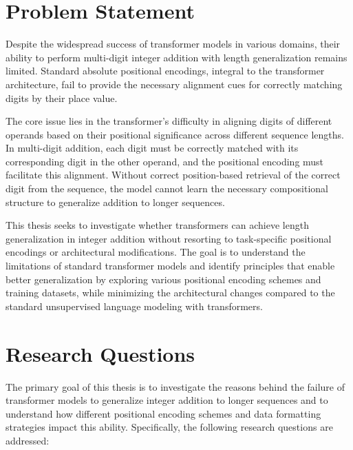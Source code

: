 \section{Problem Statement}

Despite the widespread success of transformer models in various domains, their ability to perform multi-digit integer addition with length generalization remains limited. Standard absolute positional encodings, integral to the transformer architecture, fail to provide the necessary alignment cues for correctly matching digits by their place value.

The core issue lies in the transformer's difficulty in aligning digits of different operands based on their positional significance across different sequence lengths. In multi-digit addition, each digit must be correctly matched with its corresponding digit in the other operand, and the positional encoding must facilitate this alignment. Without correct position-based retrieval of the correct digit from the sequence, the model cannot learn the necessary compositional structure to generalize addition to longer sequences.

This thesis seeks to investigate whether transformers can achieve length generalization in integer addition without resorting to task-specific positional encodings or architectural modifications. The goal is to understand the limitations of standard transformer models and identify principles that enable better generalization by exploring various positional encoding schemes and training datasets, while minimizing the architectural changes compared to the standard unsupervised language modeling with transformers.

\section{Research Questions}

The primary goal of this thesis is to investigate the reasons behind the failure of transformer models to generalize integer addition to longer sequences and to understand how different positional encoding schemes and data formatting strategies impact this ability. Specifically, the following research questions are addressed:

